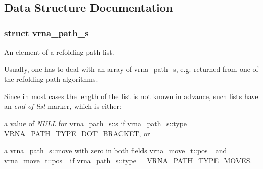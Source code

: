 \subsection{Data Structure Documentation}
\label{structvrna__path__s}
\subsubsection{struct vrna\+\_\+path\+\_\+s}
An element of a refolding path list. 

Usually, one has to deal with an array of \mbox{\hyperlink{group__paths_structvrna__path__s}{vrna\+\_\+path\+\_\+s}}, e.\+g. returned from one of the refolding-\/path algorithms.

Since in most cases the length of the list is not known in advance, such lists have an {\itshape end-\/of-\/list} marker, which is either\+:
\begin{DoxyItemize}
\item a value of {\itshape N\+U\+LL} for \mbox{\hyperlink{group__paths_a141b70a59cb81d10bc65bbb7a0f6db77}{vrna\+\_\+path\+\_\+s\+::s}} if \mbox{\hyperlink{group__paths_a5fc9e0a7dc0e0f8ad67f24c18f2dc852}{vrna\+\_\+path\+\_\+s\+::type}} = \mbox{\hyperlink{group__paths_ga3e964156b52440b65fae5e2a48750d8e}{V\+R\+N\+A\+\_\+\+P\+A\+T\+H\+\_\+\+T\+Y\+P\+E\+\_\+\+D\+O\+T\+\_\+\+B\+R\+A\+C\+K\+ET}}, or
\item a \mbox{\hyperlink{group__paths_a13da6bb5167362199947765b06a84005}{vrna\+\_\+path\+\_\+s\+::move}} with zero in both fields \mbox{\hyperlink{group__neighbors_a8af908c74786675a456d0f20cc8fcb9b}{vrna\+\_\+move\+\_\+t\+::pos\+\_}} and \mbox{\hyperlink{group__neighbors_a3849db905a45c4e399991df38705a36b}{vrna\+\_\+move\+\_\+t\+::pos\+\_}} if \mbox{\hyperlink{group__paths_a5fc9e0a7dc0e0f8ad67f24c18f2dc852}{vrna\+\_\+path\+\_\+s\+::type}} = \mbox{\hyperlink{group__paths_gaa73703da105dc6c98957fb8247c93f1f}{V\+R\+N\+A\+\_\+\+P\+A\+T\+H\+\_\+\+T\+Y\+P\+E\+\_\+\+M\+O\+V\+ES}}.
\end{DoxyItemize}

